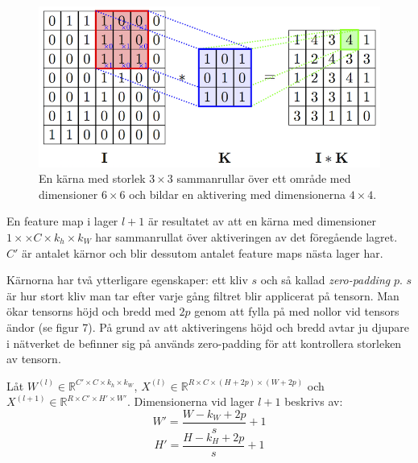 \documentclass[a4paper,11pt,twoside]{article}
\begin{document}
\begin{figure}[h]\label{figkonv}
	\centering
  		\includegraphics[scale=2.1]{convolution.png}
  	\caption{En kärna med storlek $3 \times 3$ sammanrullar över ett område med dimensioner $6 \times 6$ och bildar en aktivering med dimensionerna $4 \times 4$. \cite{figkonv}}
\end{figure}

En feature map i lager $l+1$ är resultatet av att en kärna med dimensioner $1 \times \times C  \times k_h \times k_W$ har sammanrullat över aktiveringen av det föregående lagret. $C'$ är antalet kärnor och blir dessutom antalet feature maps nästa lager har. \cite{cs231n} \cite{convmath}

Kärnorna har två ytterligare egenskaper: ett kliv $s$ och så kallad \textit{zero-padding} $p$. $s$ är hur stort kliv man tar efter varje gång filtret blir applicerat på tensorn. Man ökar tensorns höjd och bredd med $2p$ genom att fylla på med nollor vid tensors ändor (se figur 7). På grund av att aktiveringens höjd och bredd avtar ju djupare i nätverket de befinner sig på används zero-padding för att kontrollera storleken av tensorn. \cite{cs231n} \cite{convmath} \cite{convarithmetic}

Låt $W^{(l)} \in \mathbb{R}^{C' \times C  \times k_h \times k_W}$, $X^{(l)} \in \mathbb{R}^{R \times C  \times (H+2p) \times (W+2p)}$ och $X^{(l+1)} \in \mathbb{R}^{R \times C'  \times H' \times W'}$. Dimensionerna vid lager $l+1$ beskrivs av: \cite{cs231n} \cite{convmath} \cite{convarithmetic}
\begin{equation}
W' = \frac{W-k_W+2p}{s} +1
\end{equation}
\begin{equation}
H' = \frac{H-k_H+2p}{s} +1
\end{equation}
\end{document}
